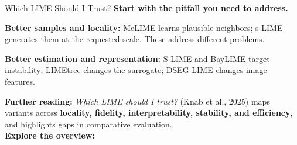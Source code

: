 \documentclass[10pt,compress,t,notes=noshow,xcolor=table]{beamer}
\begin{document}
\begin{framev}[align=top]{Which LIME Should I Trust?}
\textbf{Start with the pitfall you need to address.}
\begin{itemizeM}
\item \textbf{Better samples and locality:} MeLIME learns plausible neighbors; s-LIME generates them at the requested scale. These address different problems.
\item \textbf{Better estimation and representation:} S-LIME and BayLIME target instability; LIMEtree changes the surrogate; DSEG-LIME changes image features.
\end{itemizeM}
\spacer[0.25]
\textbf{Further reading:} \emph{Which LIME should I trust?} (Knab et al., 2025) maps variants across \textbf{locality, fidelity, interpretability, stability, and efficiency}, and highlights gaps in comparative evaluation. \\
\spacer[0.25]
\textbf{Explore the overview:}
\end{framev}


\endlecture
\end{document}
